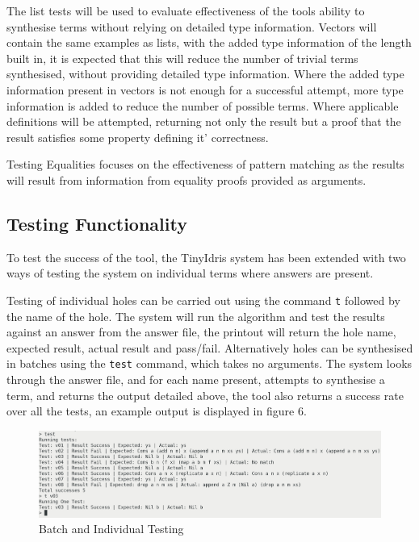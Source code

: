 \documentclass[a4paper]{article}
\begin{document}
The list tests will be used to evaluate effectiveness of the
tools ability to synthesise terms without relying on detailed
type information. Vectors will contain the same examples as lists,
with the added type information of the length built in, it is expected that
this will reduce the number of trivial terms synthesised, without providing
detailed type information. Where the added type information present in
vectors is not enough for a successful attempt, more type information is added
to reduce the number of possible terms. Where applicable definitions will be
attempted, returning not only the result but a proof that the result satisfies
some property defining it' correctness. 

Testing Equalities focuses on the effectiveness of pattern matching
as the results will result from information from equality proofs provided
as arguments. 


\subsection{Testing Functionality}

To test the success of the tool, the TinyIdris system has been extended with two ways of testing the system on individual terms
where answers are present. 

Testing of individual holes can be carried out using the 
command \texttt{t} followed by the name of the hole. The system
will run the algorithm and test the results against an answer from
the answer file, the printout will return the hole name, expected result,
actual result and pass/fail. Alternatively holes can be synthesised in 
batches using the \texttt{test} command, which takes no arguments.
The system looks through the answer file, and for each name present,
attempts to synthesise a term, and returns the output detailed above,
the tool also returns a success rate over all the tests, an example
output is displayed in figure 6.

\begin{center}
\begin{figure}[htbp]
\centering
\includegraphics[scale=0.20]{./Resource/batch-test.png}
\caption{Batch and Individual Testing}
\end{figure}
\end{center}
\end{document}

